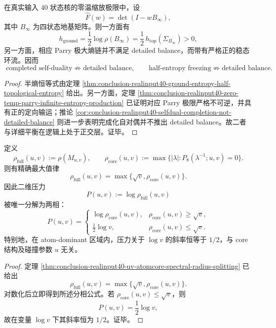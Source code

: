 \begin{theorem}\label{thm:conclusion-realinput40-halfentropy-selfduality-not-detailed-balance}
在真实输入 \(40\) 状态核的零温缩放极限中，设
\[
\widehat F(w)=\det(I-wB_\infty),
\]
其中 \(B_\infty\) 为四状态地基矩阵。则一方面有
\[
h_{\mathrm{ground}}=\frac12\log\rho(B_\infty)=\frac12\,h_{\mathrm{top}}(\Sigma_{B_\infty})>0,
\]
另一方面，相应 Parry 极大熵链并不满足 detailed balance，而带有严格正的稳态环流。因而
\[
\boxed{\;
\text{completed self-duality}
\not\Rightarrow
\text{detailed balance},\qquad
\text{half-entropy freezing}
\not\Rightarrow
\text{detailed balance}. \;}
\]
\end{theorem}
\begin{proof}
半熵恒等式由定理 \ref{thm:conclusion-realinput40-ground-entropy-half-topological-entropy} 给出。另一方面，定理 \ref{thm:conclusion-realinput40-zero-temp-parry-infinite-entropy-production} 已证明对应 Parry 极限严格不可逆，并具有正的定向输运；推论 \ref{cor:conclusion-realinput40-selfdual-completion-not-detailed-balance} 则进一步表明完成化自对偶并不推出 detailed balance。故二者与详细平衡在逻辑上处于正交层。证毕。
\end{proof}

\begin{theorem}\label{thm:conclusion-realinput40-pressure-maxlaw-two-phase}
定义
\[
\rho_{\mathrm{full}}(u,v):=\rho(M_{u,v}),
\qquad
\rho_{\mathrm{core}}(u,v):=\max\{|\lambda|:P_8(\lambda^{-1};u,v)=0\}.
\]
则有精确最大值律
\[
\boxed{\;
\rho_{\mathrm{full}}(u,v)=\max\{\sqrt v,\rho_{\mathrm{core}}(u,v)\}.\;}
\]
因此二维压力
\[
P(u,v):=\log\rho_{\mathrm{full}}(u,v)
\]
被唯一分解为两相：
\[
P(u,v)=
\begin{cases}
\log\rho_{\mathrm{core}}(u,v),& \rho_{\mathrm{core}}(u,v)\ge \sqrt v,\\[4pt]
\frac12\log v,& \rho_{\mathrm{core}}(u,v)\le \sqrt v.
\end{cases}
\]
特别地，在 atom-dominant 区域内，压力关于 \(\log v\) 的斜率恒等于 \(1/2\)，与 core 结构及碰撞参数 \(u\) 无关。
\end{theorem}
\begin{proof}
定理 \ref{thm:conclusion-realinput40-uv-atomcore-spectral-radius-splitting} 已给出
\[
\rho_{\mathrm{full}}(u,v)=\max\{\sqrt v,\rho_{\mathrm{core}}(u,v)\}.
\]
对数化后立即得到所述分相公式。若 \(\rho_{\mathrm{core}}(u,v)\le\sqrt v\)，则
\[
P(u,v)=\frac12\log v,
\]
故在变量 \(\log v\) 下其斜率恒为 \(1/2\)。证毕。
\end{proof}

